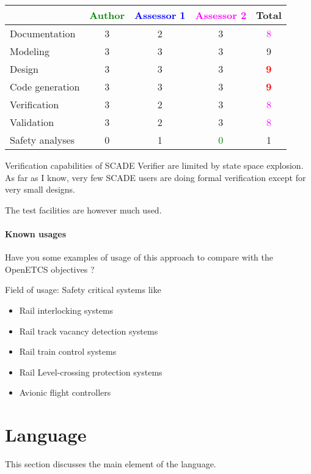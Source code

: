 \begin{tabular}{|l | c | c | c | c|}
\hline
& \textcolor{green}{Author} & \textcolor{blue}{Assessor 1} & \textcolor{magenta}{Assessor 2} & Total \\
\hline 
Documentation &  3  & 2    &3 & \textcolor{magenta}{8}  \\
\hline
Modeling &  3  & 3    &3 &  9 \\
\hline
Design &  3  & 3    &3 & \textcolor{red}{\textbf{9}} \\
\hline
Code generation &  3  & 3    &3 & \textcolor{red}{\textbf{9}} \\
\hline
Verification &  3  & 2    &3 & \textcolor{magenta}{8} \\
\hline
Validation &  3  & 2    &3 & \textcolor{magenta}{8} \\
\hline
Safety analyses &  0  & 1    & \textcolor{green}{0}   & 1    \\
\hline
\end{tabular}


\begin{assessor1}
Verification capabilities of SCADE Verifier are limited by state space
explosion. As far as I know, very few SCADE users are doing formal
verification except for very small designs.

The test facilities are however much used.
\end{assessor1}


\paragraph{Known usages} Have you some examples of usage of this approach to  compare with the OpenETCS objectives ?

Field of usage: Safety critical systems like
\begin{itemize}
	\item Rail interlocking systems
	\item Rail track vacancy detection systems
	\item Rail train control systems
	\item Rail Level-crossing protection systems
	\item Avionic flight controllers
\end{itemize}

\section{Language}
This section discusses the main element of the language.

